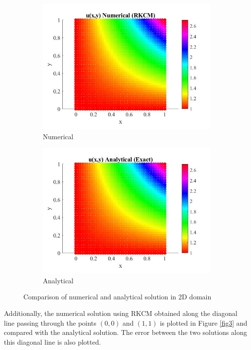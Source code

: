 \documentclass[11pt, letterpaper]{article}
\begin{document}
\begin{figure}[H]
\centering
\begin{subfigure}{.5\textwidth}
  \centering
  \includegraphics[width=0.97\linewidth]{images/1.jpg}
  \caption{Numerical}
  \label{fig2-1}
\end{subfigure}%
\begin{subfigure}{.5\textwidth}
  \centering
  \includegraphics[width=0.97\linewidth]{images/2.jpg}
  \caption{Analytical}
  \label{fig2-2}
\end{subfigure}
\caption{Comparison of numerical and analytical solution in 2D domain}
\label{fig2}
\end{figure}

Additionally, the numerical solution using RKCM obtained along the diagonal line passing through the points $(0,0)$ and $(1,1)$ is plotted in Figure \ref{fig3} and compared with the analytical solution. The error between the two solutions along this diagonal line is also plotted. 
\end{document}
